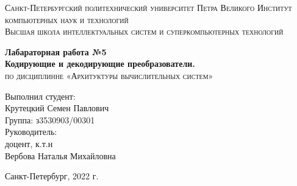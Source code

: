 \begin{titlepage}
    \begin{center}
        \textsc{
            Санкт-Петербургский политехнический университет Петра Великого Институт компьютерных наук и технологий \\[5mm]
            Высшая школа интеллектуальных систем и суперкомпьютерных технологий    
        }

        \vfill

        \textbf{
            Лабараторная работа №5 \\[2mm]
            Кодирующие и декодирующие преобразователи. \\
        }
        \textsc{
            по дисциплинне «Архитуктуры вычислительных систем»
        }
    \end{center}

    \hfill

    \begin{flushright}
        \begin{minipage}{0.35\textwidth}
            Выполнил студент: \\[2mm]
            Крутецкий Семен Павлович \\
            Группа: з3530903/00301 \\[15mm]
            Руководитель:\\[2mm] 
            доцент, к.т.н \\
            Вербова Наталья Михайловна
        \end{minipage}
    \end{flushright}
    
    \vfill

    \begin{center}
        Санкт-Петербург, 2022 г.
    \end{center}
\end{titlepage}

\newpage

\tableofcontents
\newpage